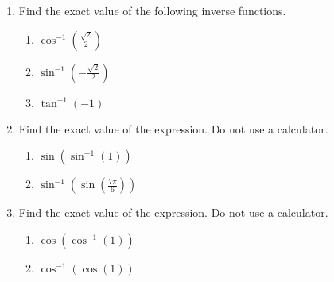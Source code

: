 


\begin{enumerate}
\item  Find the exact value of the following inverse functions.
  \begin{enumerate}
  \item $\displaystyle \cos^{-1}\left(\frac{\sqrt{2}}{2}\right)$\vfill
  \item $\displaystyle \sin^{-1}\left(-\frac{\sqrt{2}}{2}\right)$\vfill
  \item $\displaystyle \tan^{-1}(-1)$\vfill
  \end{enumerate}

\clearpage


\item  Find the exact value of the expression.  Do not use a
  calculator.
  \begin{enumerate}
  \item $\sin(\sin^{-1}(1))$\vfill
  \item $\displaystyle \sin^{-1}\left(\sin\left(\frac{7\pi}{6}\right)\right)$\vfill
  \end{enumerate}

\item  Find the exact value of the expression.  Do not use a calculator.
  \begin{enumerate}
  \item $\cos(\cos^{-1}(1))$\vfill
  \item $\displaystyle \cos^{-1}(\cos(1))$\vfill
  \end{enumerate}
\end{enumerate}




